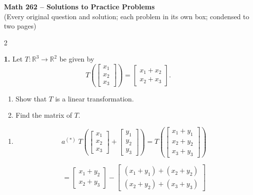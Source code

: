 \documentclass[8pt]{extarticle}
\begin{document}
\small

\begin{center}
  \Large\textbf{Math 262 -- Solutions to Practice Problems}\\[-2pt]
  \normalsize (Every original question and solution; each problem in its own box; condensed to two pages)
\end{center}

\begin{multicols}{2}
\raggedcolumns

\begin{tcolorbox}[title=Problem 1 — Original Statement and Solution]
\noindent
\textbf{1.} Let \( T:\mathbb{R}^3 \to \mathbb{R}^2 \) be given by
\[
T\!\left(
\begin{bmatrix}x_{1}\\x_{2}\\x_{3}\end{bmatrix}
\right)
=
\begin{bmatrix}
x_{1}+x_{2}\\
x_{2}+x_{3}
\end{bmatrix}.
\]

\begin{enumerate}
\item[(a)] Show that \(T\) is a linear transformation.
\item[(b)] Find the matrix of \(T\).
\end{enumerate}
\begin{enumerate}
\item
\[
a^{(*)} \; T\!\left(\begin{bmatrix} x_{1}\\ x_{2}\\ x_{3} \end{bmatrix} +
\begin{bmatrix} y_{1}\\ y_{2}\\ y_{3} \end{bmatrix}\right)
= T\!\left(\begin{bmatrix} x_{1}+y_{1}\\ x_{2}+y_{2}\\ x_{3}+y_{3} \end{bmatrix}\right)
\]

\[
= \begin{bmatrix} x_{1}+y_{2}\\ x_{2}+y_{3} \end{bmatrix}
- \begin{bmatrix} (x_{1}+y_{1})+(x_{2}+y_{2})\\ (x_{2}+y_{2})+(x_{3}+y_{3}) \end{bmatrix}
\]


\end{enumerate}
\end{tcolorbox}
\end{multicols}
\end{document}
